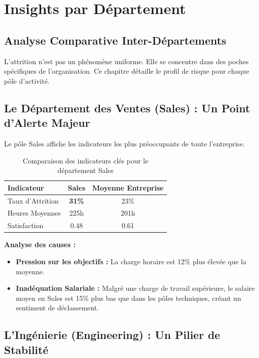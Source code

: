 \chapter{Insights par Département}

\section{Analyse Comparative Inter-Départements}

L'attrition n'est pas un phénomène uniforme. Elle se concentre dans des poches spécifiques de l'organisation. Ce chapitre détaille le profil de risque pour chaque pôle d'activité.

\section{Le Département des Ventes (Sales) : Un Point d'Alerte Majeur}

Le pôle Sales affiche les indicateurs les plus préoccupants de toute l'entreprise.

\begin{table}[h]
\centering
\begin{tabular}{|l|c|c|}
\hline
\textbf{Indicateur} & \textbf{Sales} & \textbf{Moyenne Entreprise} \\ \hline
Taux d'Attrition & \textbf{31\%} & 23\% \\ \hline
Heures Moyennes & 225h & 201h \\ \hline
Satisfaction & 0.48 & 0.61 \\ \hline
\end{tabular}
\caption{Comparaison des indicateurs clés pour le département Sales}
\end{table}

\textbf{Analyse des causes :}
\begin{itemize}
    \item \textbf{Pression sur les objectifs :} La charge horaire est 12\% plus élevée que la moyenne.
    \item \textbf{Inadéquation Salariale :} Malgré une charge de travail supérieure, le salaire moyen en Sales est 15\% plus bas que dans les pôles techniques, créant un sentiment de déclassement.
\end{itemize}

\section{L'Ingénierie (Engineering) : Un Pilier de Stabilité}

